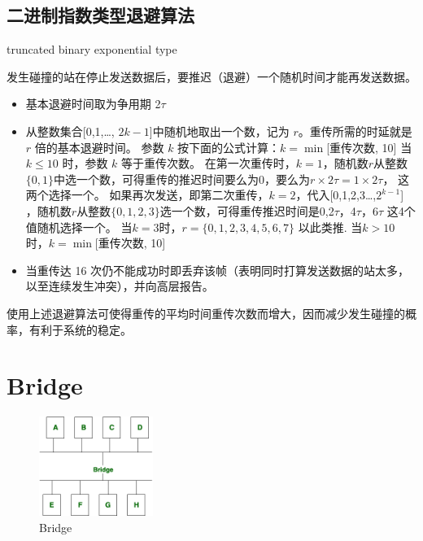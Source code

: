\documentclass[a4paper]{report}
\begin{document}
\subsection{二进制指数类型退避算法}
truncated binary exponential type

发生碰撞的站在停止发送数据后，要推迟（退避）一个随机时间才能再发送数据。
\begin{itemize}
  \item 基本退避时间取为争用期 2$\tau$
  \item 从整数集合[0,1,\dots, $2k -1$]中随机地取出一个数，记为 $r$。重传所需的时延就是 $r$ 倍的基本退避时间。
  \subitem 参数 $k$ 按下面的公式计算：$k = \min$[重传次数, 10]
  \subitem 当 $k \leq 10$ 时，参数 $k$ 等于重传次数。
  \subitem 在第一次重传时，$k=1$，随机数$r$从整数$\{0,1\}$中选一个数，可得重传的推迟时间要么为0，要么为$r\times 2\tau=1\times 2\tau$， 这两个选择一个。
  \subitem 如果再次发送，即第二次重传，$k=2$，代入[0,1,2,3\dots,$2^{k-1}$] ，随机数$r$从整数$\{0,1,2,3\}$选一个数，可得重传推迟时间是0,2$\tau$，4$\tau$，6$\tau$ 这4个值随机选择一个。
  \subitem 当$k=3$时，$r=\{0,1,2,3,4,5,6,7\}$ 以此类推. 
  \subitem 当$k>10$时，$k = \min$[重传次数, 10]
  \item 当重传达 16 次仍不能成功时即丢弃该帧（表明同时打算发送数据的站太多，以至连续发生冲突），并向高层报告。 
\end{itemize}

使用上述退避算法可使得重传的平均时间重传次数而增大，因而减少发生碰撞的概率，有利于系统的稳定。

\section{Bridge}
\begin{figure}[H]
\centering
\includegraphics[width=0.33\textwidth]{bridge.png}
\caption{Bridge}
\end{figure}
\end{document}
